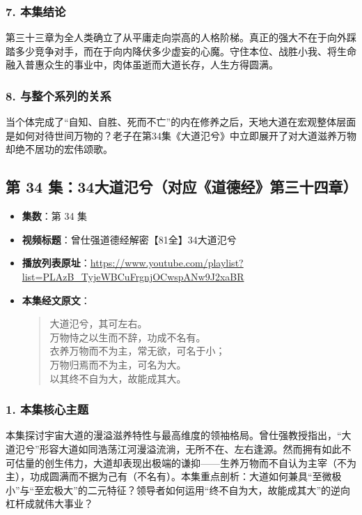 \subsubsection{7. 本集结论}
第三十三章为全人类确立了从平庸走向崇高的人格阶梯。真正的强大不在于向外踩踏多少竞争对手，而在于向内降伏多少虚妄的心魔。守住本位、战胜小我、将生命融入普惠众生的事业中，肉体虽逝而大道长存，人生方得圆满。

\subsubsection{8. 与整个系列的关系}
当个体完成了“自知、自胜、死而不亡”的内在修养之后，天地大道在宏观整体层面是如何对待世间万物的？老子在第34集《大道氾兮》中立即展开了对大道滋养万物却绝不居功的宏伟颂歌。

\clearpage

\subsection{第 34 集：34大道氾兮（对应《道德经》第三十四章）}
\label{sec:ep34}

\begin{itemize}
    \item \textbf{集数}：第 34 集
    \item \textbf{视频标题}：曾仕强道德经解密【81全】34大道氾兮
    \item \textbf{播放列表原址}：\url{https://www.youtube.com/playlist?list=PLAzB_TyjeWBCuFrgnjOCwspANw9J2xaBR}
    \item \textbf{本集经文原文}：
    \begin{quote}\kaishu
    大道氾兮，其可左右。\\
    万物恃之以生而不辞，功成不名有。\\
    衣养万物而不为主，常无欲，可名于小；\\
    万物归焉而不为主，可名为大。\\
    以其终不自为大，故能成其大。
    \end{quote}
\end{itemize}

\subsubsection{1. 本集核心主题}
本集探讨宇宙大道的漫溢滋养特性与最高维度的领袖格局。曾仕强教授指出，“大道氾兮”形容大道如同浩荡江河漫溢流淌，无所不在、左右逢源。然而拥有如此不可估量的创生伟力，大道却表现出极端的谦抑——生养万物而不自认为主宰（不为主），功成圆满而不据为己有（不名有）。本集重点剖析：大道如何兼具“至微极小”与“至宏极大”的二元特征？领导者如何运用“终不自为大，故能成其大”的逆向杠杆成就伟大事业？

